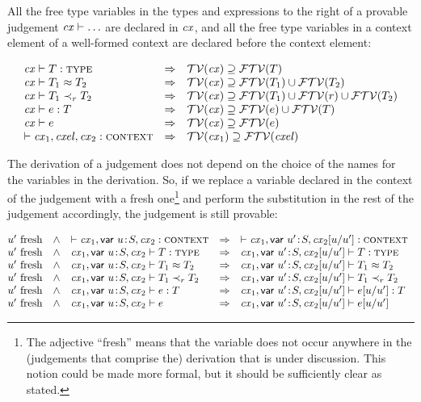 All the free type variables in the types and expressions to the right of a
provable judgement $\mathit{cx}\vdash\ldots$ are declared in $\mathit{cx}$, and all the free
type variables in a context element of a well-formed context are declared
before the context element:

\begin{theorem}\label{thm-free-tvar-in-cx}
\[
\begin{array}{l@{\ \ \IMPLIES\ \ }l}
\istyO{\typ} &
 \cxtvarO\supseteq\ftvar{\typ} \\
\teqO{\typ_1}{\typ_2} &
 \cxtvarO\supseteq\ftvar{\typ_1}\cup\ftvar{\typ_2} \\
\issubO{\typ_1}{\tspred}{\typ_2} &
 \cxtvarO\supseteq\ftvar{\typ_1}\cup\ftvar{\tspred}\cup\ftvar{\typ_2} \\
\hastyO{\expr}{\typ} &
 \cxtvarO\supseteq\ftvar{\expr}\cup\ftvar{\typ} \\
\theoO{\expr} &
 \cxtvarO\supseteq\ftvar{\expr} \\
\cxwf{\cx_1,\cxel,\cx_2} &
 \cxtvar{\cx_1}\supseteq\ftvar{\cxel}
\end{array}
\]
\end{theorem}

The derivation of a judgement does not depend on the choice of the names for
the variables in the derivation. So, if we replace a variable declared in the
context of the judgement with a fresh one\footnote{The adjective ``fresh''
means that the variable does not occur anywhere in the (judgements that
comprise the) derivation that is under discussion. This notion could be made
more formal, but it should be sufficiently clear as stated.} and perform the
substitution in the rest of the judgement accordingly, the judgement is still
provable:

\begin{theorem}\label{thm-deriv-rename-var}
\[
\begin{array}{@{\fresh{\varI'}\ \ \AND\ \ }l@{\ \ \IMPLIES\ \ }l}
\cxwf{\cxv} &
 \cxwf{\cxvI} \\
\isty{\cxv}{\typ} &
 \isty{\cxvI}{\typ} \\
\teq{\cxv}{\typ_1}{\typ_2} &
 \teq{\cxvI}{\typ_1}{\typ_2} \\
\issub{\cxv}{\typ_1}{\tspred}{\typ_2} &
 \issub{\cxvI}{\typ_1}{\tspred}{\typ_2} \\
\hasty{\cxv}{\expr}{\typ} &
 \hasty{\cxvI}{\esbsren{\expr}}{\typ} \\
\theo{\cxv}{\expr} &
 \theo{\cxvI}{\esbsren{\expr}}
\end{array}
\]
\end{theorem}

